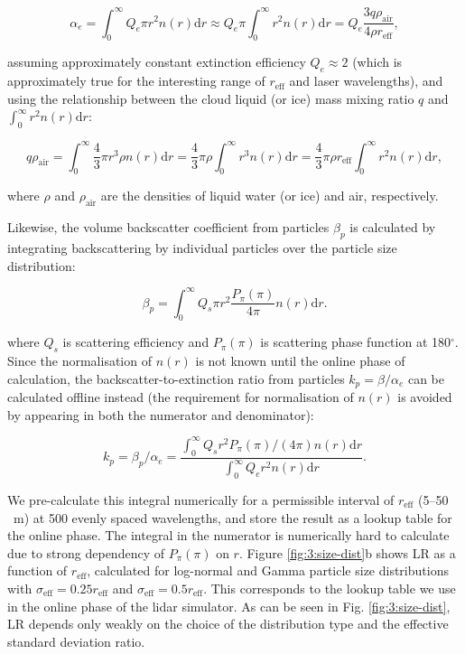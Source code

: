 \begin{equation}
\alpha_e = 
\int_0^\infty Q_e\pi r^2 n(r) \mathrm{d}r \approx
Q_e\pi\int_0^\infty r^2 n(r) \mathrm{d}r =
Q_e \frac{3q\rho_\text{air}}{4\rho r_\text{eff}} ,
\end{equation}

assuming approximately constant extinction efficiency $Q_e \approx 2$ (which is approximately true for the interesting range of $r_\text{eff}$ and laser wavelengths), and using the
relationship between the cloud liquid (or ice) mass mixing ratio $q$
and $\int_0^\infty r^2 n(r) \mathrm{d}r$:

\begin{equation}
q\rho_\text{air} = \int_0^\infty \frac{4}{3}\pi r^3 \rho n(r)\mathrm{d}r = 
\frac{4}{3}\pi\rho\int_0^\infty r^3 n(r) \mathrm{d}r =
\frac{4}{3}\pi\rho r_\text{eff}\int_0^\infty r^2 n(r) \mathrm{d}r ,
\end{equation}

where $\rho$ and $\rho_\text{air}$ are the densities of liquid water (or ice)
and air, respectively.

Likewise, the volume backscatter coefficient
from particles $\beta_p$ is calculated by integrating backscattering by
individual particles over the particle size distribution:

\begin{equation}
\beta_p =
\int_0^\infty Q_s \pi r^2 \frac{P_\pi(\pi)}{4\pi} n(r) \mathrm{d}r .
\end{equation}

where $Q_s$ is scattering efficiency and $P_\pi(\pi)$ is scattering phase function
at 180$^\circ$.
Since the normalisation of $n(r)$ is not known until the online phase of calculation,
the backscatter-to-extinction ratio from particles $k_p = \beta/\alpha_e$ can be
calculated offline instead (the requirement for normalisation of $n(r)$ is
avoided by appearing in both the numerator and denominator):

\begin{equation}
k_p = \beta_p/\alpha_e = \frac{\int_0^\infty Q_s r^2 P_\pi(\pi)/(4\pi) n(r) \mathrm{d}r}{\int_0^\infty Q_e r^2 n(r) \mathrm{d}r} .
\end{equation}

We pre-calculate this integral numerically for a permissible interval of
$r_\text{eff}$ (5--50 \unit{\mu m}) at 500 evenly spaced wavelengths,
and store the result as a lookup table for the online phase.
The integral in the numerator is numerically hard to calculate due
to strong dependency of $P_\pi(\pi)$ on $r$.
Figure \ref{fig:3:size-dist}b
shows LR as a function of $r_\text{eff}$, calculated
for log-normal and Gamma particle size distributions with $\sigma_\text{eff}
= 0.25 r_\text{eff}$ and $\sigma_\text{eff} = 0.5 r_\text{eff}$.
This corresponds to the lookup table we use in the online phase
of the lidar simulator. As can be seen in Fig. \ref{fig:3:size-dist},
LR depends only weakly on the choice of the distribution type and the effective standard
deviation ratio.


